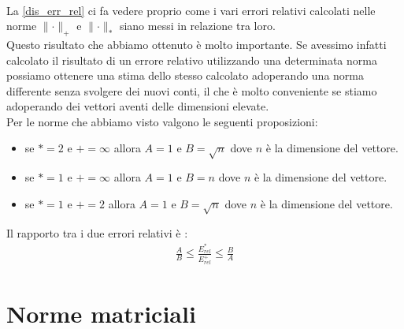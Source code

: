 \documentclass[12pt, a4paper]{book}
\theoremstyle{definition}
\begin{document}
\begin{flushleft}
\begin{equation}
\begin{split}
	\end{split}
\end{equation}
La \ref{dis_err_rel} ci fa vedere proprio come i vari errori relativi calcolati nelle norme $\lVert \cdot \rVert_{+}$ e $\lVert \cdot \rVert_{*}$ siano messi in relazione tra loro. \\
Questo risultato che abbiamo ottenuto è molto importante. Se avessimo infatti calcolato il risultato di un errore relativo utilizzando una determinata norma possiamo ottenere una stima dello stesso calcolato adoperando una norma differente senza svolgere dei nuovi conti, il che è molto conveniente se stiamo adoperando dei vettori aventi delle dimensioni elevate.\\
 
Per le norme che abbiamo visto valgono le seguenti proposizioni:  
\begin{itemize}
	\item se $*= 2$ e $+ = \infty$ allora $A=1$ e $B=\sqrt{n}$ dove $n$ è la dimensione del vettore.
	\item se $*= 1$ e $+ = \infty$ allora $A=1$ e $B=n$ dove $n$ è la dimensione del vettore.
	\item se $*= 1$ e $+ = 2$ allora $A=1$ e $B=\sqrt{n}$ dove $n$ è la dimensione del vettore.
\end{itemize}

Il rapporto tra i due errori relativi è :
\begin{equation} \label{dis_err_rel}
	\begin{split}
		\frac{A}{B} \leq \frac{E_{rel}^{*}}{E_{rel}^{
		+}} \leq \frac{B}{A}
	\end{split}
\end{equation}
\end{flushleft}
\newpage

\section{Norme matriciali}
\end{document}
